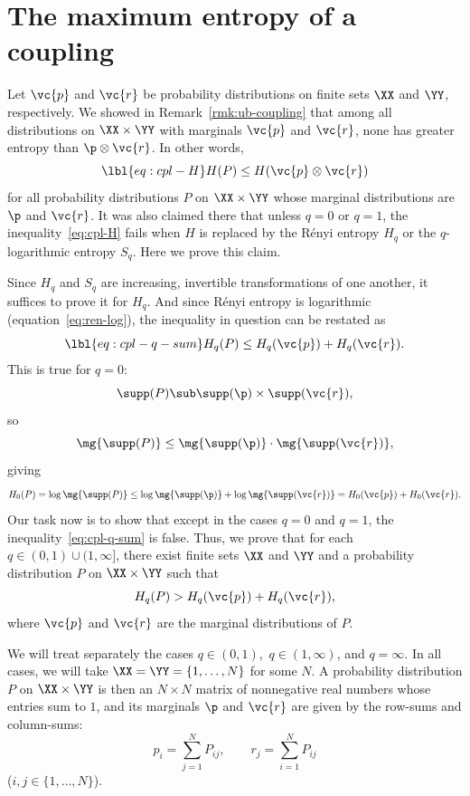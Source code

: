 \section{The maximum entropy of a coupling}


Let $\vc{p}$ and $\vc{r}$ be probability distributions on finite sets $\XX$
and $\YY$, respectively.  We showed in Remark~\ref{rmk:ub-coupling} that
among all distributions on $\XX \times \YY$ with marginals $\vc{p}$ and
$\vc{r}$, none has greater entropy than $\p \otimes \vc{r}$.  In other
words,
% 
\begin{equation}
\lbl{eq:cpl-H}
H(P) \leq H(\vc{p} \otimes \vc{r})
\end{equation}
% 
for all probability distributions $P$ on $\XX \times \YY$ whose marginal
distributions are $\p$ and $\vc{r}$.  It was also claimed there that unless
$q = 0$ or $q = 1$, the inequality~\eqref{eq:cpl-H} fails when $H$ is
replaced by the R\'enyi entropy $H_q$ or the $q$-logarithmic entropy $S_q$.
Here we prove this claim.

Since $H_q$ and $S_q$ are increasing, invertible transformations of one
another, it suffices to prove it for $H_q$.  And since R\'enyi entropy is
logarithmic (equation~\eqref{eq:ren-log}), the inequality in question can
be restated as
% 
\begin{equation}
\lbl{eq:cpl-q-sum}
H_q(P) \leq H_q(\vc{p}) + H_q(\vc{r}).
\end{equation}
% 
This is true for $q = 0$: 
\[
\supp(P) \sub \supp(\p) \times \supp(\vc{r}),
\]
so
\[
\mg{\supp(P)} \leq \mg{\supp(\p)} \cdot \mg{\supp(\vc{r})},
\]
giving
\[
H_0(P)
=
\log\mg{\supp(P)}
\leq 
\log\mg{\supp(\p)} + \log\mg{\supp(\vc{r})}
=
H_0(\vc{p}) + H_0(\vc{r}).
\]
Our task now is to show that except in the cases $q = 0$ and $q =
1$, the inequality~\eqref{eq:cpl-q-sum} is false.
% 
Thus, we prove that for each $q \in (0, 1) \cup (1, \infty]$, there
exist finite sets $\XX$ and $\YY$ and a probability distribution $P$ on
$\XX \times \YY$ such that
\[
H_q(P) > H_q(\vc{p}) + H_q(\vc{r}),
\]
where $\vc{p}$ and $\vc{r}$ are the marginal distributions of $P$.  

We will treat separately the cases $q \in (0, 1)$, \,$q \in (1, \infty)$,
and $q = \infty$.  In all cases, we will take $\XX = \YY = \{1, \ldots,
N\}$ for some $N$.  A probability distribution $P$ on $\XX \times \YY$ is
then an $N \times N$ matrix of nonnegative real numbers whose entries sum 
to $1$, and its marginals $\p$ and $\vc{r}$ are given by the row-sums and
column-sums: 
\[
p_i = \sum_{j = 1}^N P_{ij},
\qquad
r_j = \sum_{i = 1}^N P_{ij}
\]
($i, j \in \{1, \ldots, N\}$).  

